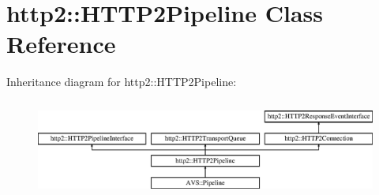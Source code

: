 \hypertarget{classhttp2_1_1HTTP2Pipeline}{}\section{http2\+:\+:H\+T\+T\+P2\+Pipeline Class Reference}
\label{classhttp2_1_1HTTP2Pipeline}
Inheritance diagram for http2\+:\+:H\+T\+T\+P2\+Pipeline\+:\begin{figure}[H]
\begin{center}
\leavevmode
\includegraphics[height=3.274854cm]{d9/dba/classhttp2_1_1HTTP2Pipeline}
\end{center}
\end{figure}
